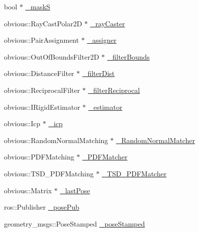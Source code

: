 \begin{DoxyCompactItemize}
\item 
bool $\ast$ \hyperlink{classohm__tsd__slam__ref_1_1ThreadLocalize_a0f697cbf384346d1c13504830a83d768}{\-\_\-mask\-S}
\item 
obvious\-::\-Ray\-Cast\-Polar2\-D $\ast$ \hyperlink{classohm__tsd__slam__ref_1_1ThreadLocalize_acf45081cf4d42221dbc924b9fd6a1384}{\-\_\-ray\-Caster}
\item 
obvious\-::\-Pair\-Assignment $\ast$ \hyperlink{classohm__tsd__slam__ref_1_1ThreadLocalize_a45c7b109a3a9f22e0c60111c58eb0dd3}{\-\_\-assigner}
\item 
obvious\-::\-Out\-Of\-Bounds\-Filter2\-D $\ast$ \hyperlink{classohm__tsd__slam__ref_1_1ThreadLocalize_aac86a10eecf70da80d5198e9296e2aea}{\-\_\-filter\-Bounds}
\item 
obvious\-::\-Distance\-Filter $\ast$ \hyperlink{classohm__tsd__slam__ref_1_1ThreadLocalize_a34e17bd9ddbcf1431feb2cca272d8d69}{\-\_\-filter\-Dist}
\item 
obvious\-::\-Reciprocal\-Filter $\ast$ \hyperlink{classohm__tsd__slam__ref_1_1ThreadLocalize_a4444f42e17414907a35919adc4904268}{\-\_\-filter\-Reciprocal}
\item 
obvious\-::\-I\-Rigid\-Estimator $\ast$ \hyperlink{classohm__tsd__slam__ref_1_1ThreadLocalize_a34dc7fcb1cc798542270309014f09b93}{\-\_\-estimator}
\item 
obvious\-::\-Icp $\ast$ \hyperlink{classohm__tsd__slam__ref_1_1ThreadLocalize_a03e76d4fd6e599eb2e508dde1553c278}{\-\_\-icp}
\item 
obvious\-::\-Random\-Normal\-Matching $\ast$ \hyperlink{classohm__tsd__slam__ref_1_1ThreadLocalize_a527f8668ebe51a6bc7cadba7075c8c3f}{\-\_\-\-Random\-Normal\-Matcher}
\item 
obvious\-::\-P\-D\-F\-Matching $\ast$ \hyperlink{classohm__tsd__slam__ref_1_1ThreadLocalize_ad9d5e74c4f7b20dcb89e108ad8cfbe08}{\-\_\-\-P\-D\-F\-Matcher}
\item 
obvious\-::\-T\-S\-D\-\_\-\-P\-D\-F\-Matching $\ast$ \hyperlink{classohm__tsd__slam__ref_1_1ThreadLocalize_a8c7ca5e711fc2a346d130c9074b4f14d}{\-\_\-\-T\-S\-D\-\_\-\-P\-D\-F\-Matcher}
\item 
obvious\-::\-Matrix $\ast$ \hyperlink{classohm__tsd__slam__ref_1_1ThreadLocalize_a9b1c9b9fbbf202c5532755553cb42964}{\-\_\-last\-Pose}
\item 
ros\-::\-Publisher \hyperlink{classohm__tsd__slam__ref_1_1ThreadLocalize_a4072511df787f573ce74945a3021cd70}{\-\_\-pose\-Pub}
\item 
geometry\-\_\-msgs\-::\-Pose\-Stamped \hyperlink{classohm__tsd__slam__ref_1_1ThreadLocalize_a53b8418b5cb138095c170ee523c5e433}{\-\_\-pose\-Stamped}

\end{DoxyCompactItemize}
